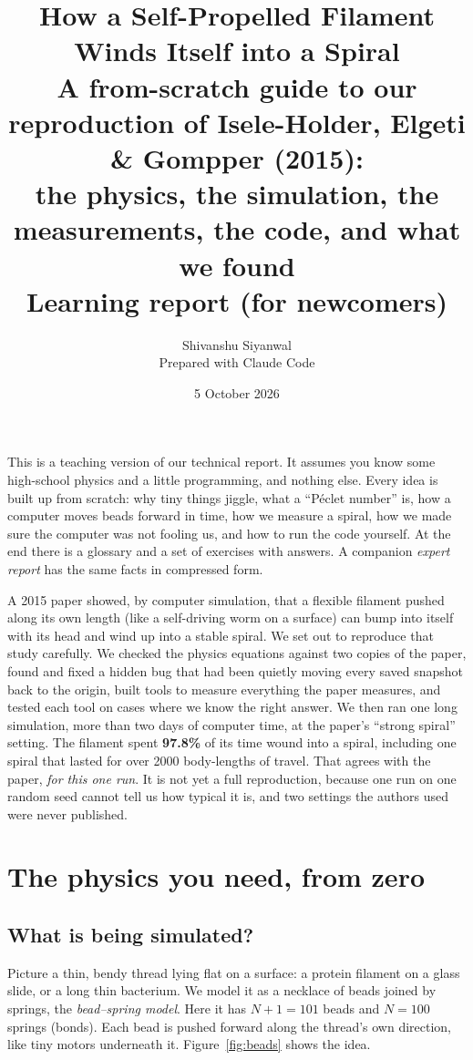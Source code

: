 \documentclass[11pt]{article}
\title{\textbf{How a Self-Propelled Filament Winds Itself into a Spiral}\\[0.4em]
\large A from-scratch guide to our reproduction of Isele-Holder, Elgeti \& Gompper (2015):\\
the physics, the simulation, the measurements, the code, and what we found\\[0.5em]
\normalsize Learning report (for newcomers)}
\author{Shivanshu Siyanwal\\[0.3em]\normalsize Prepared with Claude Code}
\date{5 October 2026}
\begin{document}
\maketitle
\thispagestyle{empty}

\begin{keybox}[title=What this document is]
This is a teaching version of our technical report. It assumes you know some high-school physics and a little programming, and nothing else.
Every idea is built up from scratch: why tiny things jiggle, what a ``Péclet number'' is, how a computer moves beads forward in time,
how we measure a spiral, how we made sure the computer was not fooling us, and how to run the code yourself.
At the end there is a glossary and a set of exercises with answers. A companion \emph{expert report} has the same facts in compressed form.
\end{keybox}

\begin{notebox}[title=The one-paragraph story]
A 2015 paper showed, by computer simulation, that a flexible filament pushed along its own length (like a self-driving worm on a surface) can bump into itself with its head and
wind up into a stable spiral. We set out to reproduce that study carefully. We checked the physics equations against two copies of the paper, found and fixed a hidden bug that
had been quietly moving every saved snapshot back to the origin, built tools to measure everything the paper measures, and tested each tool on cases where we know the right answer.
We then ran one long simulation, more than two days of computer time, at the paper's ``strong spiral'' setting. The filament spent \textbf{97.8\%} of its time wound into a spiral,
including one spiral that lasted for over 2000 body-lengths of travel. That agrees with the paper, \emph{for this one run}. It is not yet a full reproduction, because one run on one random seed cannot tell us how typical it is, and two settings the
authors used were never published.
\end{notebox}

\tableofcontents
\newpage

\section{The physics you need, from zero}
\subsection{What is being simulated?}
Picture a thin, bendy thread lying flat on a surface: a protein filament on a glass slide, or a long thin bacterium. We model it as a necklace of beads joined by springs,
the \emph{bead--spring model}. Here it has $N+1=101$ beads and $N=100$ springs (bonds). Each bead is pushed forward along the thread's own direction,
like tiny motors underneath it. Figure~\ref{fig:beads} shows the idea.
\end{document}
